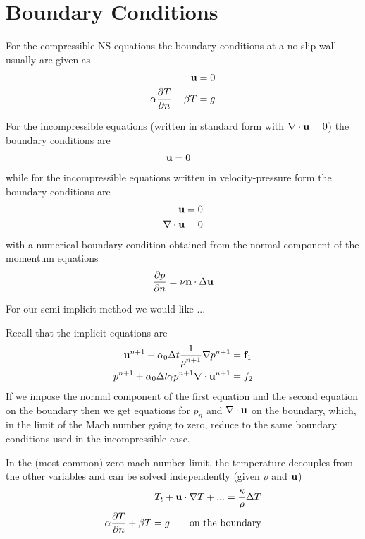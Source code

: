 \documentclass[10pt]{article}
\begin{document}
\section{Boundary Conditions}


For the compressible NS equations the boundary conditions at a no-slip wall usually are given as
\begin{align}
  {\bf u} & = 0 \\
  \alpha {\partial T \over \partial n} + \beta T &= g
\end{align}

For the incompressible equations (written in standard form with $\nabla\cdot{\bf u}=0$) the boundary conditions
are
\begin{align}
  {\bf u} & = 0 
\end{align}
while for the incompressible equations written in velocity-pressure form the boundary conditions
are
\begin{align}
  {\bf u} & = 0 \\
  \nabla\cdot{\bf u} & = 0
\end{align}
with a numerical boundary condition obtained from the normal component of the momentum equations
\[
  {\partial p \over \partial n} = \nu {\bf n}\cdot\Delta {\bf u}
\]

For our semi-implicit method we would like ...


Recall that the implicit equations are
\begin{align}
   {\bf u}^{n+1} + \alpha_0 {\Delta t} {1\over\rho^{n+1}}\nabla p^{n+1} &= {\bf f}_1  \label{eq:ui} \\
   p^{n+1} + \alpha_0 {\Delta t} \gamma p^{n+1} \nabla\cdot{\bf u}^{n+1} &= f_2   \label{eq:pi}
\end{align}
If we impose the normal component of the first equation and the second equation on the boundary 
then we get equations for $p_n$ and $\nabla\cdot{\bf u}$ on
the boundary, which, in the limit of the Mach number going to zero, reduce to the same boundary conditions
used in the incompressible case.

In the (most common) zero mach number limit, the temperature decouples from the other variables and can be
solved independently (given $\rho$ and ${\bf u}$)
\begin{align}
  T_t + {\bf u}\cdot\nabla T + ... = {\kappa\over\rho} \Delta T \\
  \alpha {\partial T \over \partial n} + \beta T = g \qquad \mbox{on the boundary}
\end{align}
  

\end{document}
